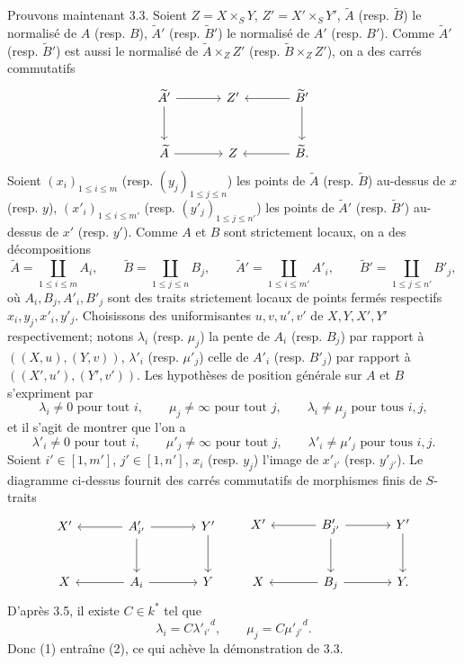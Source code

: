 \documentclass[11pt]{article}
\begin{document}
Prouvons maintenant 3.3. Soient $Z=X\times_SY$, $Z'=X'\times_SY'$, $\widetilde A$ (resp. $\widetilde B$) le normalisé de $A$ (resp. $B$), $\widetilde A'$ (resp. $\widetilde B'$) le normalisé de $A'$ (resp. $B'$). Comme $\widetilde A'$ (resp. $\widetilde B'$) est aussi le normalisé de $\widetilde A\times_ZZ'$ (resp. $\widetilde B\times_ZZ'$), on a des carrés commutatifs
\[
\begin{tikzcd}[column sep=large,row sep=large]
\widetilde A' \arrow[r] \arrow[d] & Z' & \widetilde B' \arrow[l] \arrow[d]\\
\widetilde A \arrow[r] & Z & \widetilde B . \arrow[l]
\end{tikzcd}
\]
Soient $(x_i)_{1\le i\le m}$ (resp. $(y_j)_{1\le j\le n}$) les points de $\widetilde A$ (resp. $\widetilde B$) au-dessus de $x$ (resp. $y$), $(x'_i)_{1\le i\le m'}$ (resp. $(y'_j)_{1\le j\le n'}$) les points de $\widetilde A'$ (resp. $\widetilde B'$) au-dessus de $x'$ (resp. $y'$). Comme $A$ et $B$ sont strictement locaux, on a des décompositions
\[
\widetilde A=\coprod_{1\le i\le m}A_i,\qquad
\widetilde B=\coprod_{1\le j\le n}B_j,\qquad
\widetilde A'=\coprod_{1\le i\le m'}A'_i,\qquad
\widetilde B'=\coprod_{1\le j\le n'}B'_j,
\]
où $A_i,B_j,A'_i,B'_j$ sont des traits strictement locaux de points fermés respectifs $x_i,y_j,x'_i,y'_j$. Choisissons des uniformisantes $u,v,u',v'$ de $X,Y,X',Y'$ respectivement; notons $\lambda_i$ (resp. $\mu_j$) la pente de $A_i$ (resp. $B_j$) par rapport à $((X,u),(Y,v))$, $\lambda'_i$ (resp. $\mu'_j$) celle de $A'_i$ (resp. $B'_j$) par rapport à $((X',u'),(Y',v'))$. Les hypothèses de position générale sur $A$ et $B$ s'expriment par
\begin{equation}
\lambda_i\ne0\text{ pour tout }i,\qquad
\mu_j\ne\infty\text{ pour tout }j,\qquad
\lambda_i\ne\mu_j\text{ pour tous }i,j,
\tag{1}
\end{equation}
et il s'agit de montrer que l'on a
\begin{equation}
\lambda'_i\ne0\text{ pour tout }i,\qquad
\mu'_j\ne\infty\text{ pour tout }j,\qquad
\lambda'_i\ne\mu'_j\text{ pour tous }i,j.
\tag{2}
\end{equation}
Soient $i'\in[1,m']$, $j'\in[1,n']$, $x_i$ (resp. $y_j$) l'image de $x'_{i'}$ (resp. $y'_{j'}$). Le diagramme ci-dessus fournit des carrés commutatifs de morphismes finis de $S$-traits
\[
\begin{tikzcd}[column sep=large,row sep=large]
X' & A'_{i'} \arrow[l] \arrow[r] \arrow[d] & Y' \arrow[d]\\
X & A_i \arrow[l] \arrow[r] & Y
\end{tikzcd}
\qquad
\begin{tikzcd}[column sep=large,row sep=large]
X' & B'_{j'} \arrow[l] \arrow[r] \arrow[d] & Y' \arrow[d]\\
X & B_j \arrow[l] \arrow[r] & Y .
\end{tikzcd}
\]
D'après 3.5, il existe $C\in k^*$ tel que
\[
\lambda_i=C{\lambda'_{i'}}^d,\qquad
\mu_j=C{\mu'_{j'}}^d.
\]
Donc (1) entraîne (2), ce qui achève la démonstration de 3.3.
\end{document}
